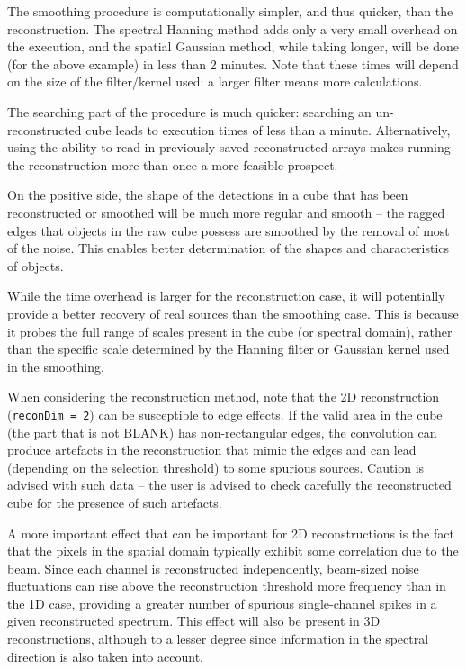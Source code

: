 The smoothing procedure is computationally simpler, and thus quicker,
than the reconstruction. The spectral Hanning method adds only a very
small overhead on the execution, and the spatial Gaussian method,
while taking longer, will be done (for the above example) in less than
2 minutes. Note that these times will depend on the size of the
filter/kernel used: a larger filter means more calculations.

The searching part of the procedure is much quicker: searching an
un-reconstructed cube leads to execution times of less than a
minute. Alternatively, using the ability to read in previously-saved
reconstructed arrays makes running the reconstruction more than once a
more feasible prospect.

On the positive side, the shape of the detections in a cube that has
been reconstructed or smoothed will be much more regular and smooth --
the ragged edges that objects in the raw cube possess are smoothed by
the removal of most of the noise. This enables better determination of
the shapes and characteristics of objects.


While the time overhead is larger for the reconstruction case, it will
potentially provide a better recovery of real sources than the
smoothing case. This is because it probes the full range of scales
present in the cube (or spectral domain), rather than the specific
scale determined by the Hanning filter or Gaussian kernel used in the
smoothing. 

When considering the reconstruction method, note that the 2D
reconstruction (\texttt{reconDim = 2}) can be susceptible to edge
effects. If the valid area in the cube (\ie the part that is not
BLANK) has non-rectangular edges, the convolution can produce
artefacts in the reconstruction that mimic the edges and can lead
(depending on the selection threshold) to some spurious
sources. Caution is advised with such data -- the user is advised to
check carefully the reconstructed cube for the presence of such
artefacts. 

A more important effect that can be important for 2D reconstructions
is the fact that the pixels in the spatial domain typically exhibit
some correlation due to the beam. Since each channel is reconstructed
independently, beam-sized noise fluctuations can rise above the
reconstruction threshold more frequency than in the 1D case, providing
a greater number of spurious single-channel spikes in a given
reconstructed spectrum. This effect will also be present in 3D
reconstructions, although to a lesser degree since information in the
spectral direction is also taken into account.

